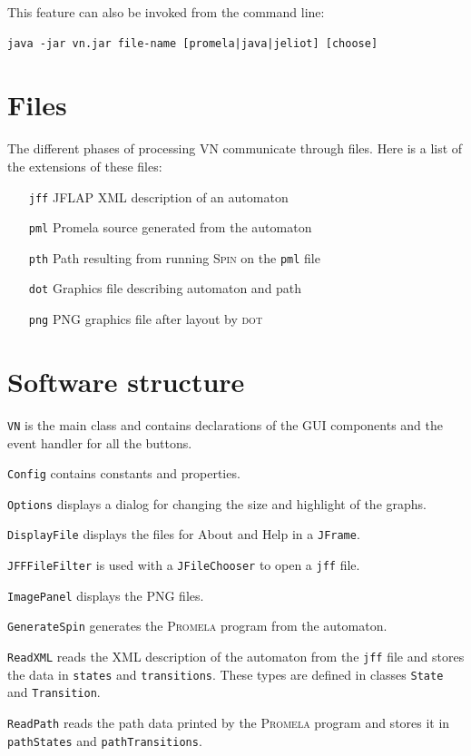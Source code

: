 \documentclass[11pt]{article}
\newcommand{\vn}{\textsc{VN}}
\newcommand{\dt}{\textsc{dot}}
\newcommand{\spn}{\textsc{Spin}}
\newcommand{\prm}{\textsc{Promela}}
\newcommand{\p}[1]{\texttt{#1}}
\newcommand{\bu}[1]{\textsf{#1}}
\begin{document}
This feature can also be invoked from the command line:
\begin{verbatim}
java -jar vn.jar file-name [promela|java|jeliot] [choose]
\end{verbatim}


\section{Files}
The different phases of processing \vn{} communicate through files. Here is a
list of the extensions of these files:
\begin{itemize}
  \item[\p{jff}] JFLAP XML description of an automaton
  \item[\p{pml}] Promela source generated from the automaton
  \item[\p{pth}] Path resulting from running \spn{} on the \p{pml} file
  \item[\p{dot}] Graphics file describing automaton and path
  \item[\p{png}] \textsc{PNG} graphics file after layout by \dt{}
\end{itemize}


\section{Software structure}
\p{VN} is the main class and contains declarations
of the GUI components and the event handler for all the buttons.

\p{Config} contains constants and properties.

\p{Options} displays a dialog for changing the size and highlight of the graphs.

\p{DisplayFile} displays the files for \bu{About} and \bu{Help}
in a \p{JFrame}.

\p{JFFFileFilter} is used with a \p{JFileChooser} to open a \p{jff} file.

\p{ImagePanel} displays the \textsc{PNG} files.

\p{GenerateSpin} generates the \prm{} program from the automaton.

\p{ReadXML} reads the XML description of the automaton from the \p{jff} file and
stores the data in \p{states} and \p{transitions}. These types are defined in
classes \p{State} and \p{Transition}.

\p{ReadPath} reads the path data printed by the \prm{} program and stores it in
\p{pathStates} and \p{pathTransitions}.
\end{document}
